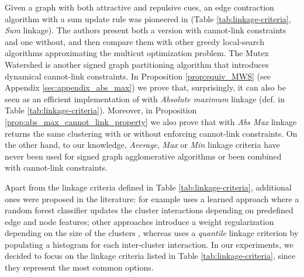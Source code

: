 Given a graph with both attractive and repulsive cues, an edge contraction algorithm with a sum update rule was pioneered in \cite{levinkov2017comparative,keuper2015efficient} (Table \ref{tab:linkage-criteria}, \emph{Sum} linkage). The authors present both a version with cannot-link constraints and one without, and then compare them with other greedy local-search algorithms approximating the multicut optimization problem.
The Mutex Watershed \cite{wolf2018mutex} is another signed graph partitioning algorithm that introduces dynamical cannot-link constraints. In Proposition \ref{prop:equiv_MWS} (see Appendix \ref{sec:appendix_abs_max}) we prove that, surprisingly, it can also be seen as an efficient implementation of \algname{} with \emph{Absolute maximum} linkage (def. in Table \ref{tab:linkage-criteria}). Moreover, in Proposition \ref{prop:abs_max_cannot_link_property} we also prove that \algname{} with \emph{Abs Max} linkage returns the same clustering with or without enforcing cannot-link constraints.
On the other hand, to our knowledge, \emph{Average}, \emph{Max} or \emph{Min} linkage criteria have never been used for signed graph agglomerative algorithms or been combined with cannot-link constraints.

Apart from the linkage criteria defined in Table \ref{tab:linkage-criteria}, additional ones were proposed in the literature:
\cite{nunez2013machine} for example uses a learned approach where a random forest classifier updates the cluster interactions depending on predefined edge and node features; other approaches introduce a weight regularization depending on the size of the clusters \cite{felzenszwalb2004efficient,kardoostsolving}, whereas 
\cite{funke2018large} uses a \emph{quantile} linkage criterion by populating a histogram for each inter-cluster interaction. In our experiments, we decided to focus on the linkage criteria listed in Table \ref{tab:linkage-criteria}, since they represent the most common options.



